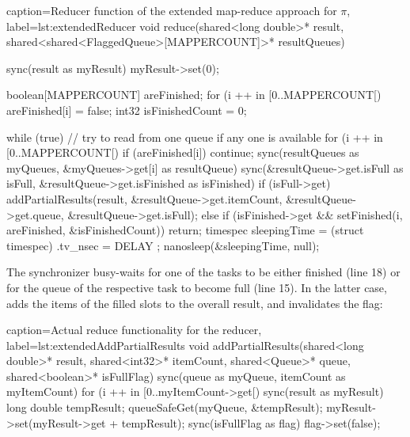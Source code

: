 \begin{ccode}{caption=Reducer function of the extended map-reduce approach for $\pi$, label=lst:extendedReducer}
void reduce(shared<long double>* result,
            shared<shared<FlaggedQueue>[MAPPERCOUNT]>* resultQueues) { 
  sync(result as myResult) { myResult->set(0); } 
   
  boolean[MAPPERCOUNT] areFinished; 
  for (i ++ in [0..MAPPERCOUNT[) { areFinished[i] = false; }
  int32 isFinishedCount = 0; 
   
  while (true) { 
    // try to read from one queue if any one is available  
    for (i ++ in [0..MAPPERCOUNT[) { 
      if (areFinished[i]) { continue; }
      sync(resultQueues as myQueues, &myQueues->get[i] as resultQueue) {
        sync(&resultQueue->get.isFull as isFull, &resultQueue->get.isFinished as isFinished) { 
          if (isFull->get) { 
            addPartialResults(result, &resultQueue->get.itemCount, &resultQueue->get.queue, 
                              &resultQueue->get.isFull); 
          } else if (isFinished->get && setFinished(i, areFinished, &isFinishedCount)) { 
            return; 
          } 
        } 
      } 
    }
    timespec sleepingTime = (struct timespec){ .tv_nsec = DELAY }; 
    nanosleep(&sleepingTime, null); 
  }
}
\end{ccode}
The synchronizer busy-waits for one of the tasks to be either finished (line 18) or for the queue of the respective task to become full (line 15). In the latter case,  adds the items of the filled slots to the overall result, and invalidates the  flag:
\begin{ccode}{caption=Actual reduce functionality for the reducer, label=lst:extendedAddPartialResults}
void addPartialResults(shared<long double>* result, shared<int32>* itemCount, 
                       shared<Queue>* queue, shared<boolean>* isFullFlag) {
  sync(queue as myQueue, itemCount as myItemCount) { 
    for (i ++ in [0..myItemCount->get[) {
      sync(result as myResult) { 
        long double tempResult; 
        queueSafeGet(myQueue, &tempResult); 
        myResult->set(myResult->get + tempResult); 
      } 
    }
  } 
  sync(isFullFlag as flag) { flag->set(false); } 
}
\end{ccode}
